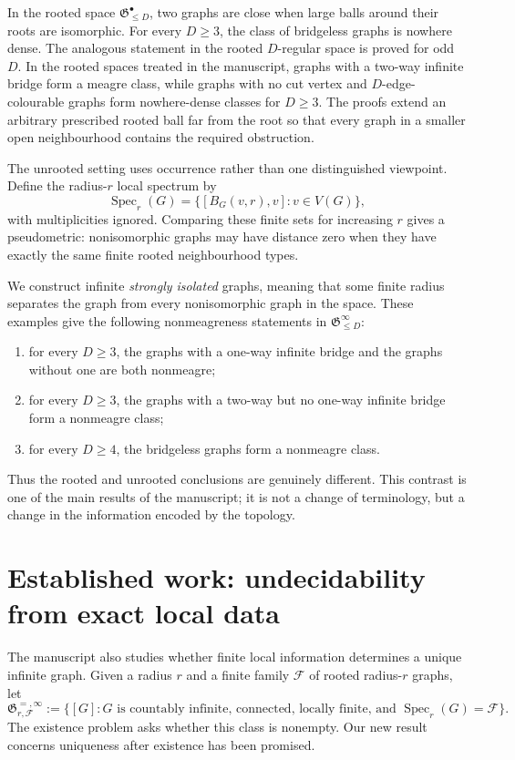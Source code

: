 \documentclass[10pt]{article}
\newcommand{\Gspace}{\mathfrak G}
\begin{document}
In the rooted space $\Gspace^{\bullet}_{\leq D}$, two graphs are close when large
balls around their roots are isomorphic.  For every $D\geq3$, the class of bridgeless
graphs is nowhere dense.  The analogous statement in the rooted $D$-regular space is
proved for odd $D$.  In the rooted spaces treated in the manuscript, graphs with a
two-way infinite bridge form a meagre class, while graphs with no cut vertex and
$D$-edge-colourable graphs form nowhere-dense classes for $D\geq3$.  The proofs extend
an arbitrary prescribed rooted ball far from the root so that every graph in a smaller
open neighbourhood contains the required obstruction.

The unrooted setting uses occurrence rather than one distinguished viewpoint.  Define
the radius-$r$ local spectrum by
\[
  \operatorname{Spec}_r(G)
  =\bigl\{[B_G(v,r),v]:v\in V(G)\bigr\},
\]
with multiplicities ignored.  Comparing these finite sets for increasing $r$ gives a
pseudometric: nonisomorphic graphs may have distance zero when they have exactly the
same finite rooted neighbourhood types.

We construct infinite \emph{strongly isolated} graphs, meaning that some finite radius
separates the graph from every nonisomorphic graph in the space.  These examples give
the following nonmeagreness statements in $\Gspace^{\infty}_{\leq D}$:
\begin{enumerate}
\item for every $D\geq3$, the graphs with a one-way infinite bridge and the graphs
      without one are both nonmeagre;
\item for every $D\geq3$, the graphs with a two-way but no one-way infinite bridge
      form a nonmeagre class;
\item for every $D\geq4$, the bridgeless graphs form a nonmeagre class.
\end{enumerate}
Thus the rooted and unrooted conclusions are genuinely different.  This contrast is
one of the main results of the manuscript; it is not a change of terminology, but a
change in the information encoded by the topology.

\section{Established work: undecidability from exact local data}

The manuscript also studies whether finite local information determines a unique
infinite graph.  Given a radius $r$ and a finite family $\mathcal F$ of rooted
radius-$r$ graphs, let
\[
 \Gspace_{r,\mathcal F}^{=,\infty}
 :=\bigl\{[G]:G\text{ is countably infinite, connected, locally finite, and }
              \operatorname{Spec}_r(G)=\mathcal F\bigr\}.
\]
The existence problem asks whether this class is nonempty.  Our new result concerns
uniqueness after existence has been promised.
\end{document}

